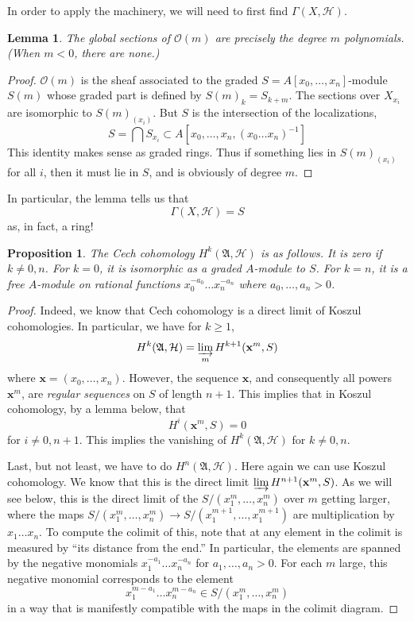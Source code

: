 \documentclass{article}
\newtheorem{lemma}{Lemma}
\newtheorem{proposition}{Proposition}
\begin{document}
In order to apply the machinery, we will need to first find $\Gamma(X,
\mathcal{H})$. 
\begin{lemma} 
The global sections of $\mathcal{O}(m)$ are precisely the degree $m$ polynomials. (When
$m <0$, there are none.)
\end{lemma} 
\begin{proof} 
$\mathcal{O}(m)$ is the sheaf associated to the graded $S=A[x_0, \dots, x_n]$-module
$S(m)$ whose graded part is defined by $S(m)_k = S_{k+m}$. The sections over
$X_{x_i}$ are isomorphic to $S(m)_{(x_i)}$. But $S$ is the intersection of the
localizations,
\[ S = \bigcap S_{x_i} \subset A[x_0, \dots, x_n, (x_0 \dots x_n)^{-1}]  \]
This identity makes sense as graded rings. Thus if something lies in
$S(m)_{(x_i)}$ for all $i$, then it must lie in $S$, and is obviously of degree
$m$.
\end{proof} 


In particular, the lemma tells us that
\[ \Gamma(X, \mathcal{H}) = S  \]
as, in fact, a ring!

\begin{proposition} 
The Cech cohomology $H^k(\mathfrak{A}, \mathcal{H})$ is as follows. 
It is zero if $k \neq 0, n$. For $k=0$, it is isomorphic as a graded $A$-module to
$S$. For $k=n$, it is a free $A$-module on rational functions $x_0^{-a_0} \dots
x_n^{-a_n}$ where $a_0, \dots, a_n>0$.
\end{proposition} 

\begin{proof} 
Indeed, we know that Cech cohomology is a direct limit of Koszul cohomologies. 
In particular, we have for $k \geq 1$,
\[ H^k(\mathfrak{A}, \mathcal{H})  =\varinjlim_m H^{k+1}( \mathbf{x}^m, S)  \]
where $\mathbf{x} = (x_0, \dots, x_n)$. However, 
the sequence $\mathbf{x}$, and consequently all powers $\mathbf{x}^m$, are
\emph{regular sequences} on $S$ of length $n+1$. This implies that in Koszul cohomology, by a
lemma below, that
\[ H^i( \mathbf{x}^m, S) = 0  \]
for $i \neq 0,n+1$. 
This implies the vanishing of $H^k(\mathfrak{A}, \mathcal{H})$ for $k \neq
0,n$. 

Last, but not least, we have to do $H^{n}(\mathfrak{A}, \mathcal{H})$. Here
again we can use Koszul cohomology. We know that this is the direct limit $\varinjlim
H^{n+1}( \mathbf{x}^m, S)$. As we will see below, this is the direct limit of the $S/(x_1^m, \dots,
x_n^m)$ over $m$ getting larger, where the maps $S/(x_1^m, \dots, x_n^m) \to
S/(x_1^{m+1}, \dots, x_1^{m+1})$ are multiplication by $x_1 \dots x_n$.
To compute the colimit of this, note that at any element in the colimit is
measured by ``its distance from the end.'' In particular, the elements are
spanned by  the negative monomials $x_1^{-a_1} \dots x_n^{-a_n}$ for $a_1,
\dots, a_n>0$. For each $m$ large, this negative monomial corresponds to the
element
\[ x_1^{m-a_1} \dots x_n^{m-a_n} \in S/(x_1^m, \dots, x_n^m)  \]
in a way that is manifestly compatible with the maps in the colimit diagram.

\end{proof} 
\end{document}

